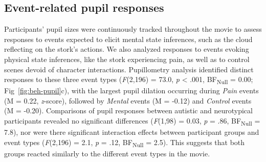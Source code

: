 
\subsection*{Event-related pupil responses}
Participants' pupil sizes were continuously tracked throughout the movie to assess responses to events expected to elicit mental state inferences, such as the cloud reflecting on the stork's actions. We also analyzed responses to events evoking physical state inferences, like the stork experiencing pain, as well as to control scenes devoid of character interactions. Pupillometry analysis identified distinct responses to these three event types (\textit{F}(2,196) = 73.0, \textit{p} < .001, BF\textsubscript{Null} = 0.00; Fig~\ref{fig:beh-pupil}c), with the largest pupil dilation occurring during \textit{Pain} events (M = 0.22, \textit{z}-score), followed by \textit{Mental} events (M = -0.12) and \textit{Control} events (M = -0.20). Comparisons of pupil responses between autistic and neurotypical participants revealed no significant differences (\textit{F}(1,98) = 0.03, \textit{p} = .86, BF\textsubscript{Null} = 7.8), nor were there significant interaction effects between participant groups and event types (\textit{F}(2,196) = 2.1, \textit{p} = .12, BF\textsubscript{Null} = 2.5). This suggests that both groups reacted similarly to the different event types in the movie.

